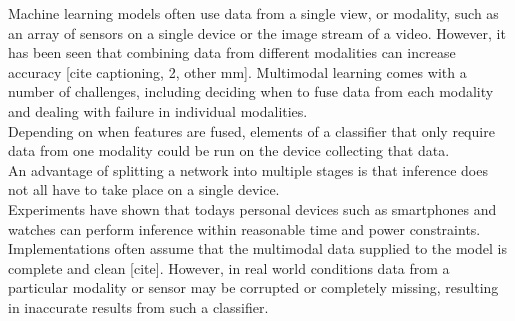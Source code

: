 Machine learning models often use data from a single view, or modality, such as an array of sensors on a single device or the image stream of a video. However, it has been seen that combining data from different modalities can increase accuracy [cite captioning, 2, other mm]. Multimodal learning comes with a number of challenges, including deciding when to fuse data from each modality and dealing with failure in individual modalities.\\

Depending on when features are fused, elements of a classifier that only require data from one modality could be run on the device collecting that data.\\

An advantage of splitting a network into multiple stages is that inference does not all have to take place on a single device.\\

Experiments \cite{RaduMultimodal,CNNwatch,snapdragon} have shown that todays personal devices such as smartphones and watches can perform inference within reasonable time and power constraints.\\

Implementations often assume that the multimodal data supplied to the model is complete and clean [cite]. However, in real world conditions data from a particular modality or sensor may be corrupted or completely missing, resulting in inaccurate results from such a classifier.\\
